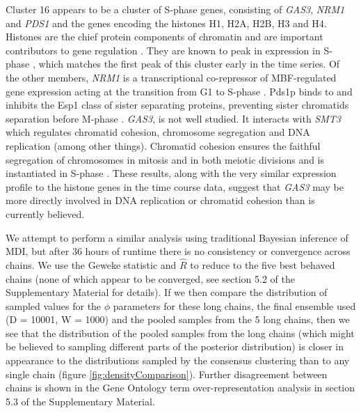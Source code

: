 \documentclass{bmcart}
\begin{document}
Cluster 16 appears to be a cluster of S-phase genes, consisting of \emph{GAS3}, \emph{NRM1} and \emph{PDS1} and the genes encoding the histones H1, H2A, H2B, H3 and H4. Histones are the chief protein components of chromatin \citep{fischle2003histone} and are important contributors to gene regulation \citep{bannister2011regulation}. They are known to peak in expression in S-phase \citep{granovskaia2010high}, which matches the first peak of this cluster early in the time series. Of the other members, \emph{NRM1} is a transcriptional co-repressor of MBF-regulated gene expression acting at the transition from G1 to S-phase \citep{de2006constraining, aligianni2009fission}. Pds1p binds to and inhibits the Esp1 class of sister separating proteins, preventing sister chromatids separation before M-phase \citep{ciosk1998esp1, toth1999yeast}. \emph{GAS3}, is not well studied. It interacts with \emph{SMT3} which regulates chromatid cohesion, chromosome segregation and DNA replication (among other things). Chromatid cohesion ensures the faithful segregation of chromosomes in mitosis and in both meiotic divisions \citep{cooper2009pds1p} and is instantiated in S-phase \citep{toth1999yeast}. These results, along with the very similar expression profile to the histone genes in the time course data, suggest that \emph{GAS3} may be more directly involved in DNA replication or chromatid cohesion than is currently believed.


We attempt to perform a similar analysis using traditional Bayesian inference of MDI, but after 36 hours of runtime there is no consistency or convergence across chains.  We use the Geweke statistic and $\hat{R}$ to reduce to the five best behaved chains (none of which appear to be converged, see section 5.2 of the Supplementary Material for details). If we then compare the distribution of sampled values for the $\phi$ parameters for these long chains, the final ensemble used (D = 10001, W = 1000) and the pooled samples from the 5 long chains, then we see that the distribution of the pooled samples from the long chains (which might be believed to sampling different parts of the posterior distribution) is closer in appearance to the distributions sampled by the consensus clustering than to any single chain (figure \ref{fig:densityComparison}). Further disagreement between chains is shown in the Gene Ontology term over-representation analysis in section 5.3 of the Supplementary Material.
\end{document}
